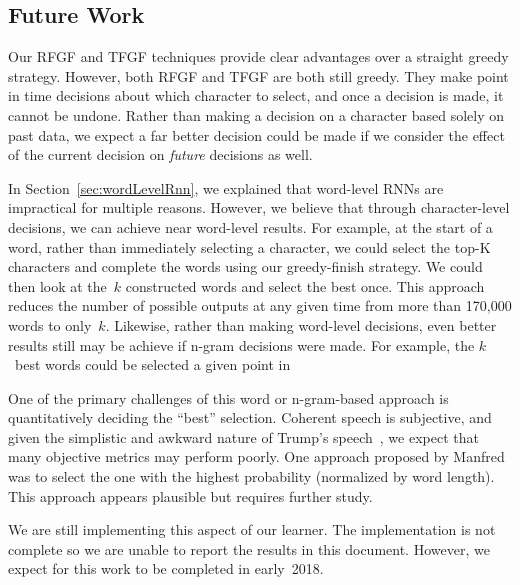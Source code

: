 \documentclass{article}
\begin{document}
\subsection{Future Work}

Our RFGF and TFGF techniques provide clear advantages over a straight greedy strategy.  However, both RFGF and TFGF are both still greedy.  They make point in time decisions about which character to select, and once a decision is made, it cannot be undone.  Rather than making a decision on a character based solely on past data, we expect a far better decision could be made if we consider the effect of the current decision on \textit{future} decisions as well.

In Section~\ref{sec:wordLevelRnn}, we explained that word-level RNNs are impractical for multiple reasons. However, we believe that through character-level decisions, we can achieve near word-level results.  For example, at the start of a word, rather than immediately selecting a character, we could select the top-K characters and complete the words using our greedy-finish strategy.  We could then look at the~$k$ constructed words and select the best once.  This approach reduces the number of possible outputs at any given time from more than 170,000 words to only~$k$.  Likewise, rather than making word-level decisions, even better results still may be achieve if n-gram decisions were made.  For example, the $k$~best words could be selected a given point in 

One of the primary challenges of this word or n-gram-based approach is quantitatively deciding the ``best'' selection.  Coherent speech is subjective, and given the simplistic and awkward nature of Trump's speech~\cite{goldhill2017}, we expect that many objective metrics may perform poorly. One approach proposed by Manfred was to select the one with the highest probability (normalized by word length). This approach appears plausible but requires further study.

We are still implementing this aspect of our learner.  The implementation is not complete so we are unable to report the results in this document.  However, we expect for this work to be completed in early~2018.



\end{document}
